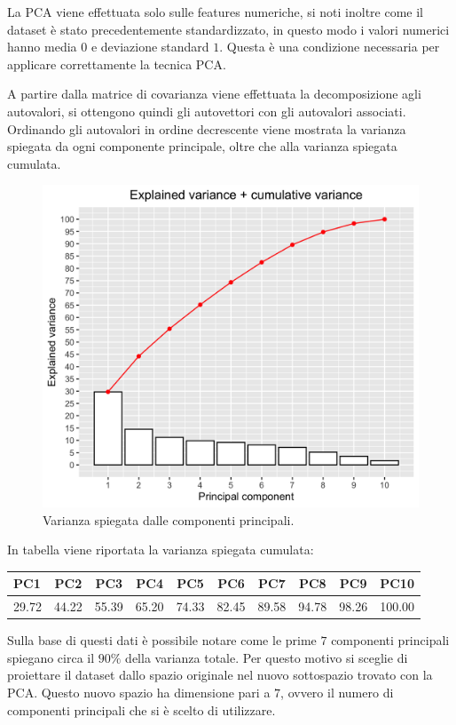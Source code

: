 La PCA viene effettuata solo sulle features numeriche, si noti inoltre
come il dataset è stato precedentemente standardizzato, in questo modo
i valori numerici hanno media $0$ e deviazione standard $1$. Questa è
una condizione necessaria per applicare correttamente la tecnica PCA.

A partire dalla matrice di covarianza viene effettuata la
decomposizione agli autovalori, si ottengono quindi gli autovettori
con gli autovalori associati. Ordinando gli autovalori in ordine
decrescente viene mostrata la varianza spiegata da ogni componente
principale, oltre che alla varianza spiegata cumulata.

\begin{figure}[H]
	\centering
	\includegraphics[width=13cm]{../images/pca_variance_explained.png}
	\caption{Varianza spiegata dalle componenti principali.}
\end{figure}

In tabella viene riportata la varianza spiegata cumulata:


	\begin{tabular}{|l c c c c c c c c c|} 
		\hline
		PC1 & PC2 & PC3 & PC4 & PC5 & PC6 & PC7 & PC8 & PC9 & PC10\\
		\hline
		29.72 &
		44.22 &
		55.39 &
		65.20 &
		74.33 &
		82.45 &
		89.58 &
		94.78 &
		98.26 &
		100.00 \\
		\hline
		
	\end{tabular}

Sulla base di questi dati è possibile notare come le prime $7$
componenti principali spiegano circa il $90\%$ della varianza
totale. Per questo motivo si sceglie di proiettare il dataset dallo
spazio originale nel nuovo sottospazio trovato con la PCA. Questo
nuovo spazio ha dimensione pari a $7$, ovvero il numero di componenti
principali che si è scelto di utilizzare.

